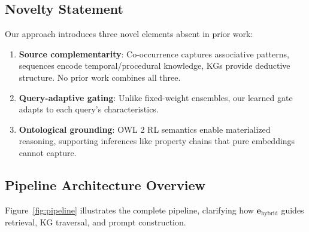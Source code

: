\documentclass[10pt,twocolumn]{article}
\begin{document}
\subsection{Novelty Statement}
\label{sec:novelty}

Our approach introduces three novel elements absent in prior work:

\begin{enumerate}
    \item \textbf{Source complementarity}: Co-occurrence captures associative patterns, sequences encode temporal/procedural knowledge, KGs provide deductive structure. No prior work combines all three.
    \item \textbf{Query-adaptive gating}: Unlike fixed-weight ensembles, our learned gate adapts to each query's characteristics.
    \item \textbf{Ontological grounding}: OWL 2 RL semantics enable materialized reasoning, supporting inferences like property chains that pure embeddings cannot capture.
\end{enumerate}


\subsection{Pipeline Architecture Overview}
\label{sec:pipeline}

Figure~\ref{fig:pipeline} illustrates the complete pipeline, clarifying how $\mathbf{e}_{\text{hybrid}}$ guides retrieval, KG traversal, and prompt construction.
\end{document}
